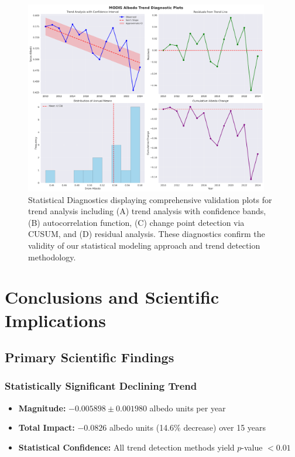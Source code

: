 \documentclass[12pt,a4paper]{article}
\newcommand{\pvalue}{$p$-value}
\begin{document}
\begin{figure}[H]
\centering
\includegraphics[width=0.95\textwidth]{../../results/plots/trend_diagnostics.png}
\caption{Statistical Diagnostics displaying comprehensive validation plots for trend analysis including (A) trend analysis with confidence bands, (B) autocorrelation function, (C) change point detection via CUSUM, and (D) residual analysis. These diagnostics confirm the validity of our statistical modeling approach and trend detection methodology.}
\label{fig:trend_diagnostics}
\end{figure}

\section{Conclusions and Scientific Implications}

\subsection{Primary Scientific Findings}

\subsubsection{Statistically Significant Declining Trend}
\begin{itemize}
    \item \textbf{Magnitude:} $-0.005898 \pm 0.001980$ albedo units per year
    \item \textbf{Total Impact:} $-0.0826$ albedo units (14.6\% decrease) over 15 years
    \item \textbf{Statistical Confidence:} All trend detection methods yield \pvalue{} $< 0.01$
\end{itemize}
\end{document}

